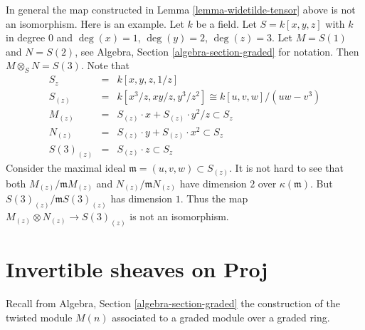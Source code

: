 \begin{remark}
\label{remark-not-isomorphism}
In general the map constructed in Lemma \ref{lemma-widetilde-tensor}
above is not an isomorphism. Here is an example. Let $k$
be a field. Let $S = k[x, y, z]$ with $k$ in degree $0$ and
$\deg(x) = 1$, $\deg(y) = 2$, $\deg(z) = 3$.
Let $M = S(1)$ and $N = S(2)$, see
Algebra, Section \ref{algebra-section-graded}
for notation. Then $M \otimes_S N = S(3)$.
Note that
\begin{eqnarray*}
S_z
& = &
k[x, y, z, 1/z] \\
S_{(z)}
& = &
k[x^3/z, xy/z, y^3/z^2]
\cong
k[u, v, w]/(uw - v^3) \\
M_{(z)} & = & S_{(z)} \cdot x + S_{(z)} \cdot y^2/z \subset S_z \\
N_{(z)} & = & S_{(z)} \cdot y + S_{(z)} \cdot x^2 \subset S_z \\
S(3)_{(z)} & = & S_{(z)} \cdot z \subset S_z
\end{eqnarray*}
Consider the maximal ideal $\mathfrak m = (u, v, w) \subset S_{(z)}$.
It is not hard to see that both $M_{(z)}/\mathfrak mM_{(z)}$
and $N_{(z)}/\mathfrak mN_{(z)}$ have dimension $2$ over
$\kappa(\mathfrak m)$. But
$S(3)_{(z)}/\mathfrak mS(3)_{(z)}$ has dimension $1$.
Thus the map $M_{(z)} \otimes N_{(z)} \to S(3)_{(z)}$ is not
an isomorphism.
\end{remark}









\section{Invertible sheaves on Proj}
\label{section-invertible-on-proj}

\noindent
Recall from Algebra, Section \ref{algebra-section-graded}
the construction of the twisted module $M(n)$ associated
to a graded module over a graded ring.

